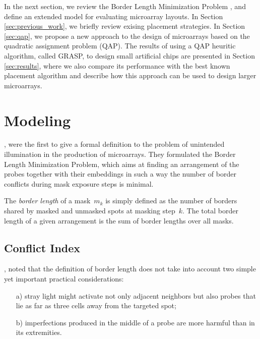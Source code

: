\documentclass{bioinfo}
\begin{document}
In the next section, we review the Border Length Minimization Problem \citep{HANNENHALLI02}, and define an extended model for evaluating microarray layouts. In Section \ref{sec:previous_work}, we briefly review exising placement strategies. In Section \ref{sec:qap}, we propose a new approach to the design of microarrays based on the quadratic assignment problem (QAP). The results of using a QAP heuritic algorithm, called GRASP, to design small artificial chips are presented in Section \ref{sec:results}, where we also compare its performance with the best known placement algorithm and describe how this approach can be used to design larger microarrays.

\section{Modeling}
\label{sec:modelling}

\citealp{HANNENHALLI02}, were the first to give a formal definition to the problem of unintended illumination in the production of microarrays. They formulated the Border Length Minimization Problem, which aims at finding an arrangement of the probes together with their embeddings in such a way the number of border conflicts during mask exposure steps is minimal.

The \emph{border length} of a mask~$m_{k}$ is simply defined as the number of borders shared by masked and unmasked spots at masking step~$k$. The total border length of a given arrangement is the sum of border lengths over all masks.

\subsection{Conflict Index}

\citealp{KAHNG03A}, noted that the definition of border length does not take into account two simple yet important practical considerations:
\begin{itemize}
\item[a)] stray light might activate not only adjacent neighbors but also probes that lie as far as three cells away from the targeted spot;
\item[b)] imperfections produced in the middle of a probe are more harmful than in its extremities.
\end{itemize}
\end{document}
